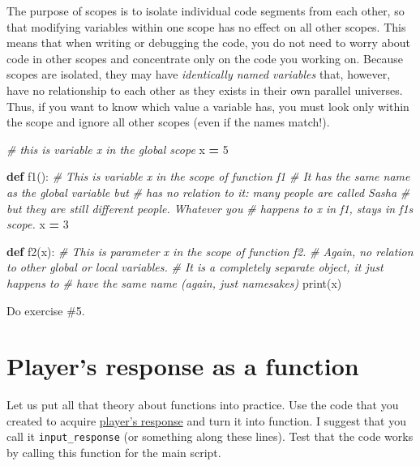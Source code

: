 \documentclass[
]{book}
\newenvironment{Shaded}{\begin{snugshade}}{\end{snugshade}}
\newcommand{\BuiltInTok}[1]{#1}
\newcommand{\CommentTok}[1]{\textcolor[rgb]{0.56,0.35,0.01}{\textit{#1}}}
\newcommand{\DecValTok}[1]{\textcolor[rgb]{0.00,0.00,0.81}{#1}}
\newcommand{\KeywordTok}[1]{\textcolor[rgb]{0.13,0.29,0.53}{\textbf{#1}}}
\newcommand{\NormalTok}[1]{#1}
\newcommand{\OperatorTok}[1]{\textcolor[rgb]{0.81,0.36,0.00}{\textbf{#1}}}
\begin{document}
The purpose of scopes is to isolate individual code segments from each other, so that modifying variables within one scope has no effect on all other scopes. This means that when writing or debugging the code, you do not need to worry about code in other scopes and concentrate only on the code you working on. Because scopes are isolated, they may have \emph{identically named variables} that, however, have no relationship to each other as they exists in their own parallel universes. Thus, if you want to know which value a variable has, you must look only within the scope and ignore all other scopes (even if the names match!).

\begin{Shaded}
\begin{Highlighting}[]
\CommentTok{\# this is variable \textasciigrave{}x\textasciigrave{} in the global scope}
\NormalTok{x  }\OperatorTok{=} \DecValTok{5} 

\KeywordTok{def}\NormalTok{ f1():}
  \CommentTok{\# This is variable \textasciigrave{}x\textasciigrave{} in the scope of function f1}
  \CommentTok{\# It has the same name as the global variable but}
  \CommentTok{\# has no relation to it: many people are called Sasha }
  \CommentTok{\# but they are still different people. Whatever you}
  \CommentTok{\# happens to \textasciigrave{}x\textasciigrave{} in f1, stays in f1\textquotesingle{}s scope.}
\NormalTok{  x }\OperatorTok{=} \DecValTok{3}
  
  
\KeywordTok{def}\NormalTok{ f2(x):}
  \CommentTok{\# This is parameter \textasciigrave{}x\textasciigrave{} in the scope of function f2.}
  \CommentTok{\# Again, no relation to other global or local variables.}
  \CommentTok{\# It is a completely separate object, it just happens to }
  \CommentTok{\# have the same name (again, just namesakes)}
  \BuiltInTok{print}\NormalTok{(x)}
\end{Highlighting}
\end{Shaded}

Do exercise \#5.

\hypertarget{players-response-as-a-function}{%
\section{Player's response as a function}\label{players-response-as-a-function}}

Let us put all that theory about functions into practice. Use the code that you created to acquire \protect\hyperlink{guess-the-number-players-response}{player's response} and turn it into function. I suggest that you call it \texttt{input\_response} (or something along these lines). Test that the code works by calling this function for the main script.
\end{document}
